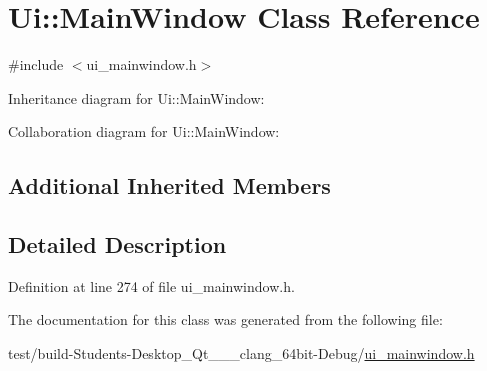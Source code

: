 \hypertarget{class_ui_1_1_main_window}{}\section{Ui\+:\+:Main\+Window Class Reference}
\label{class_ui_1_1_main_window}


{\ttfamily \#include $<$ui\+\_\+mainwindow.\+h$>$}



Inheritance diagram for Ui\+:\+:Main\+Window\+:


Collaboration diagram for Ui\+:\+:Main\+Window\+:
\subsection*{Additional Inherited Members}


\subsection{Detailed Description}


Definition at line 274 of file ui\+\_\+mainwindow.\+h.



The documentation for this class was generated from the following file\+:\begin{DoxyCompactItemize}
\item 
test/build-\/\+Students-\/\+Desktop\+\_\+\+Qt\+\_\+\_\+\_\+clang\+\_\+64bit-\/\+Debug/\hyperlink{ui__mainwindow_8h}{ui\+\_\+mainwindow.\+h}\end{DoxyCompactItemize}
